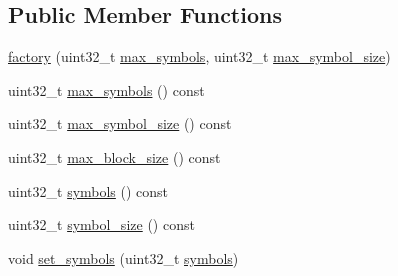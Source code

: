 \subsection*{Public Member Functions}
\begin{DoxyCompactItemize}
\item 
\hyperlink{classkodo_1_1storage__block__info_1_1factory_a2b78d66537c15211f5bb16851d5872a4}{factory} (uint32\-\_\-t \hyperlink{classkodo_1_1storage__block__info_1_1factory_a8e483ce61d3071d1163ce2b416636327}{max\-\_\-symbols}, uint32\-\_\-t \hyperlink{classkodo_1_1storage__block__info_1_1factory_a31628978ac63e1c5aacee725bb38859e}{max\-\_\-symbol\-\_\-size})
\item 
uint32\-\_\-t \hyperlink{classkodo_1_1storage__block__info_1_1factory_a8e483ce61d3071d1163ce2b416636327}{max\-\_\-symbols} () const 
\begin{DoxyCompactList}\small\item\em \end{DoxyCompactList}\item 
uint32\-\_\-t \hyperlink{classkodo_1_1storage__block__info_1_1factory_a31628978ac63e1c5aacee725bb38859e}{max\-\_\-symbol\-\_\-size} () const 
\begin{DoxyCompactList}\small\item\em \end{DoxyCompactList}\item 
uint32\-\_\-t \hyperlink{classkodo_1_1storage__block__info_1_1factory_a6bcd751654f9dc626adcc88cf720be88}{max\-\_\-block\-\_\-size} () const 
\begin{DoxyCompactList}\small\item\em \end{DoxyCompactList}\item 
uint32\-\_\-t \hyperlink{classkodo_1_1storage__block__info_1_1factory_af4aa14fbbfe12d58d36a4ad7fa7d98bd}{symbols} () const 
\begin{DoxyCompactList}\small\item\em \end{DoxyCompactList}\item 
uint32\-\_\-t \hyperlink{classkodo_1_1storage__block__info_1_1factory_ae137e86bb02d5bcadb770e1b6a8df8bb}{symbol\-\_\-size} () const 
\begin{DoxyCompactList}\small\item\em \end{DoxyCompactList}\item 
void \hyperlink{classkodo_1_1storage__block__info_1_1factory_a1343e41426e92ceac616d8b3f8348f46}{set\-\_\-symbols} (uint32\-\_\-t \hyperlink{classkodo_1_1storage__block__info_1_1factory_af4aa14fbbfe12d58d36a4ad7fa7d98bd}{symbols})

\end{DoxyCompactItemize}
